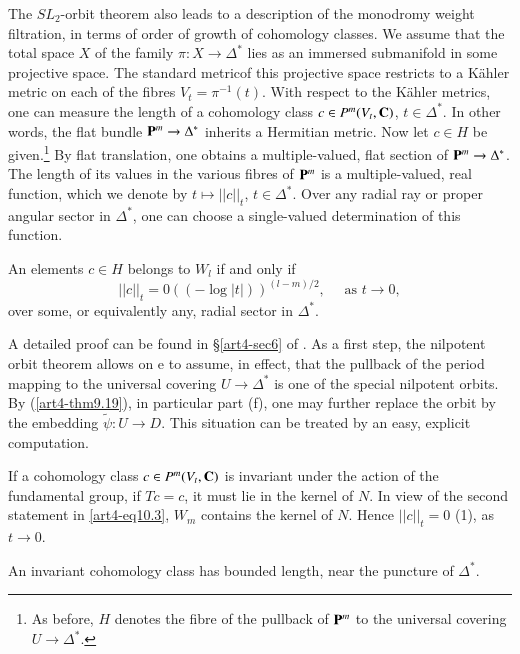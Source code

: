 The $SL_2$-orbit theorem also leads to a description of the monodromy weight filtration, in terms of order of growth of cohomology classes. We assume that the total space $X$ of the family $\pi: X \to \Delta^\ast$ lies as an immersed submanifold in some projective space. The standard metric\pageoriginale of this projective space restricts to a K\"ahler metric on each of the fibres $V_t = \pi^{-1}(t)$. With respect to the K\"ahler metrics, one can measure the length of a cohomology class $c \in P^m (V_t, \mathbf{C})$, $t \in \Delta^\ast$. In other words, the flat bundle $\mathbf{P}^m \to \Delta^\ast$ inherits a Hermitian metric. Now let $c \in H$ be given.\footnote[42]{As before, $H$ denotes the fibre of the pullback of $\mathbf{P}^m$ to the universal covering $U \to \Delta^\ast$.} By flat translation, one obtains a multiple-valued, flat section of $\mathbf{P}^m \to \Delta^\ast$. The length of its values in the various fibres of $\mathbf{P}^m$ is a multiple-valued, real function, which we denote by $t \longmapsto ||c||_t$, $t \in \Delta^\ast$. Over any radial ray or proper angular sector in $\Delta^\ast$, one can choose a single-valued determination of this function.

\begin{theorem}\label{art4-thm10.8}
An elements $c \in H$ belongs to $W_l$ if and only if 
$$
||c ||_t = 0 ((-\log |t|))^{(l-m)/2}, \quad \text{ as } t \to 0,
$$
over some, or equivalently any, radial sector in $\Delta^\ast$.
\end{theorem}

A detailed proof can be found in \S \ref{art4-sec6} of \cite{art4-key41}. As a first step, the nilpotent orbit theorem allows on e to assume, in effect, that the pullback of the period mapping to the universal covering $U \to \Delta^\ast$ is one of the special nilpotent orbits. By (\ref{art4-thm9.19}), in particular part (f), one may further replace the orbit by the embedding $\tilde{\psi} : U \to D$. This situation can be treated by an easy, explicit computation.

If a cohomology class $c \in P^m (V_t, \mathbf{C})$ is invariant under the action of the fundamental group, \ie if $Tc = c$, it must lie in the kernel of $N$. In view of the second statement in \eqref{art4-eq10.3}, $W_m$ contains the kernel of $N$. Hence $||c||_t = 0$ (1), as $t \to 0$.

\begin{coro}\label{art4-eq10.9}
An invariant cohomology class has bounded length, near the puncture of $\Delta^\ast$.
\end{coro}


